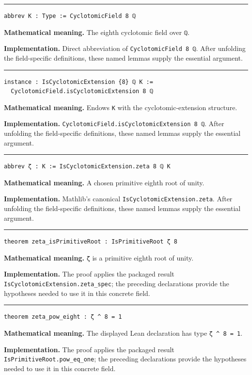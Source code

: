 \documentclass[UTF8,a4paper,11pt,fontset=fandol]{ctexart}
\theoremstyle{definition}
\newcommand{\statementsep}{\par\medskip\hrule\medskip}
\begin{document}
\statementsep
\begin{verbatim}
abbrev K : Type := CyclotomicField 8 ℚ
\end{verbatim}
\noindent\textbf{Mathematical meaning.} The eighth cyclotomic field over \texttt{ℚ}.\par
\noindent\textbf{Implementation.} Direct abbreviation of \texttt{CyclotomicField 8 ℚ}. After unfolding the field-specific definitions, these named lemmas supply the essential argument.\par
\statementsep
\begin{verbatim}
instance : IsCyclotomicExtension {8} ℚ K :=
  CyclotomicField.isCyclotomicExtension 8 ℚ
\end{verbatim}
\noindent\textbf{Mathematical meaning.} Endows \texttt{K} with the cyclotomic-extension structure.\par
\noindent\textbf{Implementation.} \texttt{CyclotomicField.\allowbreak{}isCyclotomicExtension 8 ℚ}. After unfolding the field-specific definitions, these named lemmas supply the essential argument.\par
\statementsep
\begin{verbatim}
abbrev ζ : K := IsCyclotomicExtension.zeta 8 ℚ K
\end{verbatim}
\noindent\textbf{Mathematical meaning.} A chosen primitive eighth root of unity.\par
\noindent\textbf{Implementation.} Mathlib's canonical \texttt{IsCyclotomicExtension.\allowbreak{}zeta}. After unfolding the field-specific definitions, these named lemmas supply the essential argument.\par
\statementsep
\begin{verbatim}
theorem zeta_isPrimitiveRoot : IsPrimitiveRoot ζ 8
\end{verbatim}
\noindent\textbf{Mathematical meaning.} \texttt{ζ} is a primitive eighth root of unity.\par
\noindent\textbf{Implementation.} The proof applies the packaged result \texttt{IsCyclotomicExtension.\allowbreak{}zeta\_\allowbreak{}spec}; the preceding declarations provide the hypotheses needed to use it in this concrete field.\par
\statementsep
\begin{verbatim}
theorem zeta_pow_eight : ζ ^ 8 = 1
\end{verbatim}
\noindent\textbf{Mathematical meaning.} The displayed Lean declaration has type \texttt{ζ \textasciicircum{} 8 = 1}.\par
\noindent\textbf{Implementation.} The proof applies the packaged result \texttt{IsPrimitiveRoot.\allowbreak{}pow\_\allowbreak{}eq\_\allowbreak{}one}; the preceding declarations provide the hypotheses needed to use it in this concrete field.\par
\end{document}
